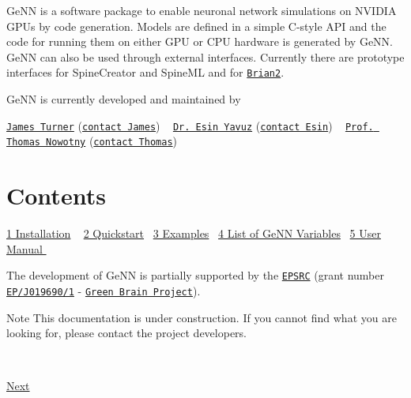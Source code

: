 Ge\+N\+N is a software package to enable neuronal network simulations on N\+V\+I\+D\+I\+A G\+P\+Us by code generation. Models are defined in a simple C-\/style A\+P\+I and the code for running them on either G\+P\+U or C\+P\+U hardware is generated by Ge\+N\+N. Ge\+N\+N can also be used through external interfaces. Currently there are prototype interfaces for Spine\+Creator and Spine\+M\+L and for \href{http://http://brian2.readthedocs.org/en/2.0beta/index.html}{\tt Brian2}.

Ge\+N\+N is currently developed and maintained by

\href{http://www.sussex.ac.uk/informatics/people/peoplelists/person/288366}{\tt James Turner} (\href{mailto:jt273@sussex.ac.uk}{\tt contact James}) ~\newline
 \href{http://www.sussex.ac.uk/profiles/320683}{\tt Dr. Esin Yavuz} (\href{mailto:E.Yavuz@sussex.ac.uk}{\tt contact Esin}) ~\newline
 \href{http://www.sussex.ac.uk/informatics/people/peoplelists/person/206151}{\tt Prof. Thomas Nowotny} (\href{mailto:T.Nowotny@sussex.ac.uk}{\tt contact Thomas}) ~\newline
\hypertarget{index_Contents}{}\section{Contents}\label{index_Contents}
\hyperlink{Installation}{1 Installation} ~\newline
 \hyperlink{Quickstart}{2 Quickstart}~\newline
 \hyperlink{Examples}{3 Examples}~\newline
 \hyperlink{ListOfVariables}{4 List of Ge\+N\+N Variables}~\newline
 \hyperlink{UserManual}{5 User Manual }~\newline


The development of Ge\+N\+N is partially supported by the \href{http://www.epsrc.ac.uk/}{\tt E\+P\+S\+R\+C} (grant number \href{http://gow.epsrc.ac.uk/NGBOViewGrant.aspx?GrantRef=EP/J019690/1}{\tt E\+P/\+J019690/1} -\/ \href{http://greenbrainproject.co.uk/}{\tt Green Brain Project}).

\begin{DoxyNote}{Note}
This documentation is under construction. If you cannot find what you are looking for, please contact the project developers.
\end{DoxyNote}
~\newline
 

 \hyperlink{Installation}{Next } 